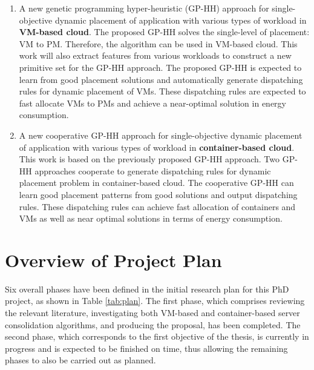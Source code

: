 \begin{enumerate}
	\item A new genetic programming hyper-heuristic (GP-HH) approach for single-objective dynamic placement of application with various types of workload in \textbf{VM-based cloud}. The proposed GP-HH solves the single-level of placement: VM to PM. Therefore, the algorithm can be used in VM-based cloud. This work will also extract features from various workloads to construct a new primitive set for the GP-HH approach. The proposed GP-HH is expected to learn from good placement solutions and automatically generate dispatching rules for dynamic placement of VMs. These dispatching rules are expected to fast allocate VMs to PMs and achieve a near-optimal solution in energy consumption.

	\item A new cooperative GP-HH approach for single-objective dynamic placement of application with various types of workload in \textbf{container-based cloud}. This work is based on the previously proposed GP-HH approach. Two GP-HH approaches cooperate to generate dispatching rules for dynamic placement problem in container-based cloud.  The cooperative GP-HH can learn good placement patterns from good solutions and output dispatching rules. These dispatching rules can achieve fast allocation of containers and VMs as well as near optimal solutions in terms of energy consumption.
\end{enumerate}

\section{Overview of Project Plan}
Six overall phases have been defined in the initial research plan for this PhD project, as
shown in Table \ref{tab:plan}. The first phase, which comprises reviewing the relevant literature, investigating both VM-based and container-based server consolidation algorithms, and producing the proposal, has
been completed. The second phase, which corresponds to the first objective of the thesis, is
currently in progress and is expected to be finished on time, thus allowing the remaining
phases to also be carried out as planned.


